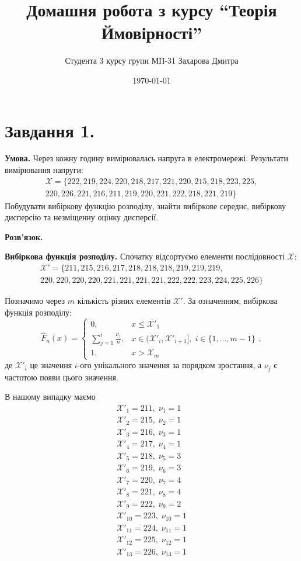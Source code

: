 \documentclass[14pt]{extarticle}
\title{Домашня робота з курсу ``Теорія Ймовірності''}
\author{Студента 3 курсу групи МП-31 Захарова Дмитра}
\date{\today}
\begin{document}
\maketitle

\section*{Завдання 1.} 

\textbf{Умова.} Через кожну годину вимірювалась напруга в електромережі. Результати вимірювання напруги:
\begin{gather*}
\mathcal{X}=\{222, 219, 224, 220, 218, 217, 221, 220, 215, 218, 223, 225,\\ 220, 226, 221, 216, 211, 219, 220, 221, 222, 218, 221, 219\}
\end{gather*}
Побудувати вибіркову функцію розподілу, знайти вибіркове середнє, вибіркову дисперсію та незміщенну оцінку дисперсії.

\textbf{Розв'язок.} 

\textbf{Вибіркова функція розподілу.} Спочатку відсортуємо елементи послідовності $\mathcal{X}$:
\begin{gather*}
\mathcal{X}' = \{211, 215, 216, 217, 218, 218, 218, 219, 219, 219, \\ 220, 220, 220, 220, 221, 221, 221, 221, 222, 222, 223, 224, 225, 226\}
\end{gather*}

Позначимо через $m$ кількість різних елементів $\mathcal{X}'$. За означенням, вибіркова функція розподілу:
\[
\hat{F}_n(x) = \begin{cases}
    0, & x \leq \mathcal{X}'_1 \\
    \sum_{j=1}^i\frac{\nu_j}{n}, & x \in (\mathcal{X}'_i, \mathcal{X}'_{i+1}], \; i\in \{1,\dots,m-1\} \\
    1, & x > \mathcal{X}_{m}
\end{cases},
\]
де $\mathcal{X}'_i$ це значення $i$-ого унікального значення за порядком зростання, а $\nu_j$ є частотою появи цього значення.  

В нашому випадку маємо
\begin{gather*}
\mathcal{X}'_1=211, \; \nu_1 = 1 \\
\mathcal{X}'_2=215, \; \nu_2 = 1 \\
\mathcal{X}'_3=216, \; \nu_3 = 1 \\
\mathcal{X}'_4=217, \; \nu_4 = 1 \\
\mathcal{X}'_5=218, \; \nu_5 = 3 \\
\mathcal{X}'_6=219, \; \nu_6 = 3 \\
\mathcal{X}'_7=220, \; \nu_7 = 4 \\
\mathcal{X}'_8=221, \; \nu_8 = 4 \\
\mathcal{X}'_9=222, \; \nu_9 = 2 \\
\mathcal{X}'_{10}=223, \; \nu_{10} = 1 \\
\mathcal{X}'_{11}=224, \; \nu_{11} = 1 \\
\mathcal{X}'_{12}=225, \; \nu_{12} = 1 \\
\mathcal{X}'_{13}=226, \; \nu_{13} = 1 \\
\end{gather*}
\end{document}
